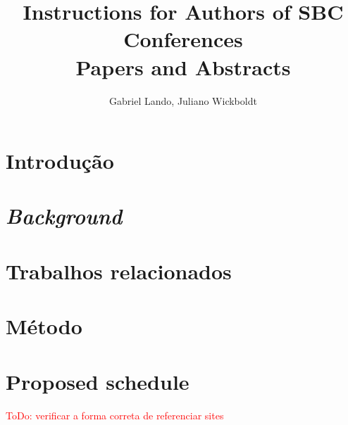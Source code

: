 \documentclass[12pt]{article}
\title{Instructions for Authors of SBC Conferences\\ Papers and Abstracts}
\author{Gabriel Lando\inst{1}, Juliano Wickboldt\inst{1}}
\begin{document}
 

\maketitle

\begin{abstract}

\end{abstract}
     
\begin{resumo} 

\end{resumo}

\section{Introdução}


\section{\textit{Background}} \label{sec:background}


\section{Trabalhos relacionados}


\section{Método}


\section{Proposed schedule}


\textcolor{red}{ToDo: verificar a forma correta de referenciar sites}



\end{document}
